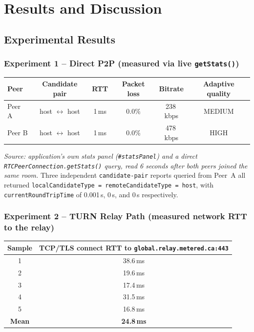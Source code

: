\documentclass[12pt,a4paper]{report}
\begin{document}
\chapter{Results and Discussion}

\section{Experimental Results}

\subsection{Experiment 1 -- Direct P2P (measured via live \texttt{getStats()})}
\begin{center}
\begin{tabular}{lccccc}
\toprule
\textbf{Peer} & \textbf{Candidate pair} & \textbf{RTT} & \textbf{Packet loss} & \textbf{Bitrate} & \textbf{Adaptive quality} \\
\midrule
Peer A & host $\leftrightarrow$ host & 1\,ms & 0.0\% & 238\,kbps & MEDIUM \\
Peer B & host $\leftrightarrow$ host & 1\,ms & 0.0\% & 478\,kbps & HIGH \\
\bottomrule
\end{tabular}
\end{center}
\emph{Source: application's own stats panel (\texttt{\#statsPanel}) and a direct
\texttt{RTCPeerConnection.getStats()} query, read 6 seconds after both peers joined the
same room.} Three independent \texttt{candidate-pair} reports queried from Peer~A all
returned \texttt{localCandidateType = remoteCandidateType = host}, with
\texttt{currentRoundTripTime} of 0.001\,s, 0\,s, and 0\,s respectively.

\subsection{Experiment 2 -- TURN Relay Path (measured network RTT to the relay)}
\begin{center}
\begin{tabular}{cc}
\toprule
\textbf{Sample} & \textbf{TCP/TLS connect RTT to \texttt{global.relay.metered.ca:443}} \\
\midrule
1 & 38.6\,ms \\
2 & 19.6\,ms \\
3 & 17.4\,ms \\
4 & 31.5\,ms \\
5 & 16.8\,ms \\
\midrule
\textbf{Mean} & \textbf{24.8\,ms} \\
\bottomrule
\end{tabular}
\end{center}
\end{document}
